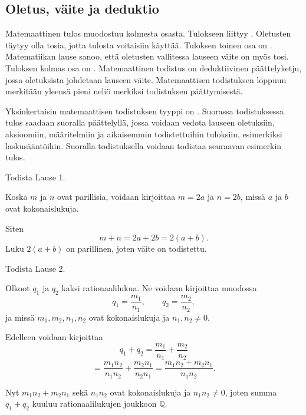 \subsection*{Oletus, väite ja deduktio} %

Matemaattinen tulos muodostuu kolmesta osasta. Tulokseen liittyy .
Oletusten täytyy olla tosia, jotta tulosta voitaisiin käyttää. Tuloksen toinen osa on .
Matematiikan lause sanoo, että oletusten vallitessa lauseen väite on myös tosi.
Tuloksen kolmas osa on . Matemaattinen todistus on deduktiivinen päättelyketju,
jossa oletuksista johdetaan lauseen väite. Matemaattisen todistuksen loppuun merkitään yleensä
pieni neliö merkiksi todistuksen päättymisestä.

Yksinkertaisin matemaattisen todistuksen tyyppi on .
Suorassa todistuksessa tulos saadaan suoralla päättelyllä, jossa voidaan vedota lauseen oletuksiin,
aksioomiin, määritelmiin ja aikaisemmin todistettuihin tuloksiin, esimerkiksi laskusääntöihin.
Suoralla todistuksella voidaan todistaa seuraavan esimerkin tulos.


\begin{esimerkki}
	Todista Lause 1.
	
	\begin{todistus}
		Koska $m$ ja $n$ ovat parillisia, voidaan kirjoittaa $m=2a$ ja $n=2b$, missä $a$ ja $b$ ovat kokonaislukuja.
		
		Siten
		\[
			m+n =2a+2b = 2(a+b).
		\]
		Luku $2(a+b)$ on parillinen, joten väite on todistettu.
	\end{todistus}
\end{esimerkki}


\begin{esimerkki}
	Todista Lause 2.
	
	\begin{todistus}
		Olkoot $q_1$ ja $q_2$ kaksi rationaalilukua. Ne voidaan kirjoittaa muodossa
		\[
			q_1=\frac{m_1}{n_1},\qquad 
			q_2=\frac{m_2}{n_2},
		\]
		ja missä $m_1,m_2,n_1,n_2$ ovat kokonaislukuja ja $n_1,n_2\neq 0$.

		Edelleen voidaan kirjoittaa
		\[
			q_1+q_2 = \frac{m_1}{n_1}+ \frac{m_2}{n_2}
		\]
		\[
			= \frac{m_1 n_2}{n_1 n_2}+ \frac{m_2 n_1}{n_2 n_1} = \frac{m_1n_2 + m_2 n_1}{n_1 n_2}.
		\]

		Nyt $m_1n_2 + m_2 n_1$ sekä $n_1 n_2$ ovat kokonaislukuja ja $n_1 n_2\neq 0$, joten summa $q_1+q_2$ kuuluu rationaalilukujen joukkoon $\mathbb{Q}$.
	\end{todistus}
\end{esimerkki}

